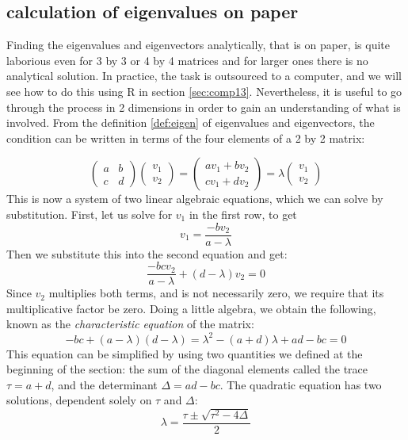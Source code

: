 \documentclass[
]{book}
\theoremstyle{definition}
\theoremstyle{definition}
\theoremstyle{definition}
\theoremstyle{remark}
\begin{document}
\hypertarget{calculation-of-eigenvalues-on-paper}{%
\subsection{calculation of eigenvalues on paper}\label{calculation-of-eigenvalues-on-paper}}

Finding the eigenvalues and eigenvectors analytically, that is on paper, is quite laborious even for 3 by 3 or 4 by 4 matrices and for larger ones there is no analytical solution. In practice, the task is outsourced to a computer, and we will see how to do this using R in section \ref{sec:comp13}. Nevertheless, it is useful to go through the process in 2 dimensions in order to gain an understanding of what is involved. From the definition \ref{def:eigen} of eigenvalues and eigenvectors, the condition can be written in terms of the four elements of a 2 by 2 matrix:

\[  \left(\begin{array}{cc}a & b \\c & d\end{array}\right)\left(\begin{array}{c}v_1 \\ v_2 \end{array}\right) = \left(\begin{array}{c}av_1 +b v_2\\ cv_1+ dv_2 \end{array}\right) = \lambda \left(\begin{array}{c}v_1 \\ v_2 \end{array}\right)  \]
This is now a system of two linear algebraic equations, which we can solve by substitution. First, let us solve for \(v_1\) in the first row, to get
\[ v_1 = \frac{-bv_2}{a-\lambda}\]
Then we substitute this into the second equation and get:
\[\frac{-bcv_2}{a-\lambda} +(d-\lambda)v_2 = 0\]
Since \(v_2\) multiplies both terms, and is not necessarily zero, we require that its multiplicative factor be zero. Doing a little algebra, we obtain the following, known as the \emph{characteristic equation} of the matrix:
\[ -bc +(a-\lambda)(d-\lambda) = \lambda^2-(a+d)\lambda +ad-bc = 0\]
This equation can be simplified by using two quantities we defined at the beginning of the section: the sum of the diagonal elements called the trace \(\tau = a+d\), and the determinant \(\Delta = ad-bc\). The quadratic equation has two solutions, dependent solely on \(\tau\) and \(\Delta\):
\[
\lambda = \frac{\tau \pm \sqrt{\tau^2-4\Delta}}{2}
\]
\end{document}
